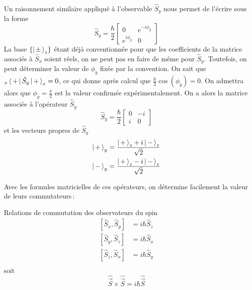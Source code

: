 \begin{demo}
\begin{align*}
        \end{align*}
        Un raisonnement similaire appliqué à l’observable $\hat{S}_y$ nous permet de l’écrire sous la forme 
        \[ \hat{S}_y = \frac{\hbar}{2} \begin{bmatrix}
            0 & e^{-i\phi_y} \\
            e^{i\phi_y} & 0
        \end{bmatrix} \]
        La base $\left\{\left| \, \pm \, \right>_z\right\}$ étant déjà conventionnée pour que les coefficients de la matrice associés à $\hat{S}_x$ soient réels, on ne peut pas en faire de même pour $\hat{S}_y$. Toutefois, on peut déterminer la valeur de $\phi_y$ fixée par la convention. On sait que $_x\left< \, + \, \right| \hat{S}_y \left| \, + \, \right>_x = 0$, ce qui donne après calcul que $\frac{\hbar}{2} \cos(\phi_y) = 0$. On admettra alors que $\phi_y = \frac{\pi}{2}$ est la valeur confirmée expérimentalement. On a alors la matrice associée à l’opérateur $\hat{S}_y$
         \[ \hat{S}_y = \frac{\hbar}{2} \begin{bmatrix}
            0 & -i \\
            i & 0
        \end{bmatrix} \]
        et les vecteurs propres de $\hat{S}_y$ 
        \begin{align*}
            \left| \, + \, \right>_y &= \frac{\left| \, + \, \right>_z + i \left| \, - \, \right>_z}{\sqrt{2}} \\
            \left| \, - \, \right>_y &= \frac{\left| \, + \, \right>_z - i \left| \, - \, \right>_z}{\sqrt{2}} \\
        \end{align*}

        \end{demo}

        
        Avec les formules matricielles de ces opérateurs, on détermine facilement la valeur de leurs commutateurs :

        \begin{omed}{Relations de commutation des observateurs du spin}
            \begin{align*}
                \left[\hat{S}_x, \hat{S}_y\right] &= i\hbar \hat{S}_z \\
                \left[\hat{S}_y, \hat{S}_z\right] &= i\hbar \hat{S}_x \\
                \left[\hat{S}_z, \hat{S}_x\right] &= i\hbar \hat{S}_y \\
            \end{align*}
            soit 
            \[ \hat{\vec{S}} \times \hat{\vec{S}} = i \hbar \hat{\vec{S}} \]
        \end{omed}

